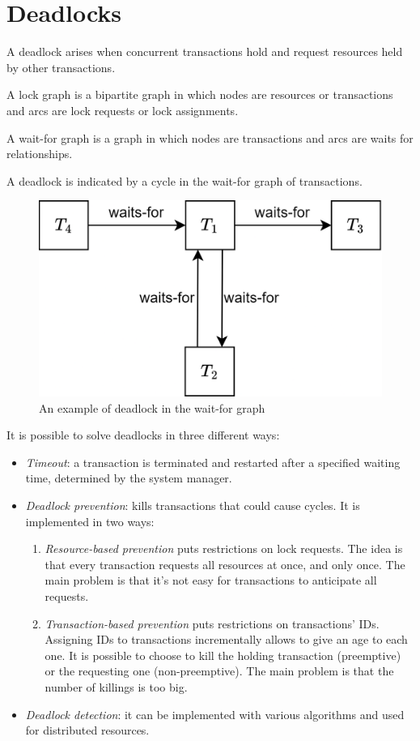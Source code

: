 \section{Deadlocks}

A deadlock arises when concurrent transactions hold and request resources held by other transactions.
\begin{definition}
    A lock graph is a bipartite graph in which nodes are resources or transactions and arcs are lock requests or lock assignments. 
\end{definition}
\begin{definition}
    A wait-for graph is a graph in which nodes are transactions and arcs are waits for relationships. 
\end{definition}
A deadlock is indicated by a cycle in the wait-for graph of transactions.
\begin{figure}[H]
    \centering
    \includegraphics[width=0.5\linewidth]{images/waitgraph.png}
    \caption{An example of deadlock in the wait-for graph}
\end{figure}
It is possible to solve deadlocks in three different ways: 
\begin{itemize}
    \item \textit{Timeout}: a transaction is terminated and restarted after a specified waiting time, determined by the system manager.
    \item \textit{Deadlock prevention}: kills transactions that could cause cycles. 
        It is implemented in two ways: 
        \begin{enumerate}
            \item \textit{Resource-based prevention} puts restrictions on lock requests. 
                The idea is that every transaction requests all resources at once, and only once. 
                The main problem is that it's not easy for transactions to anticipate all requests. 
            \item \textit{Transaction-based prevention} puts restrictions on transactions' IDs. 
                Assigning IDs to transactions incrementally allows to give an age to each one. 
                It is possible to choose to kill the holding transaction (preemptive) or the requesting one (non-preemptive). 
                The main problem is that the number of killings is too big. 
        \end{enumerate}
    \item \textit{Deadlock detection}: it can be implemented with various algorithms and used for distributed resources. 
\end{itemize}

